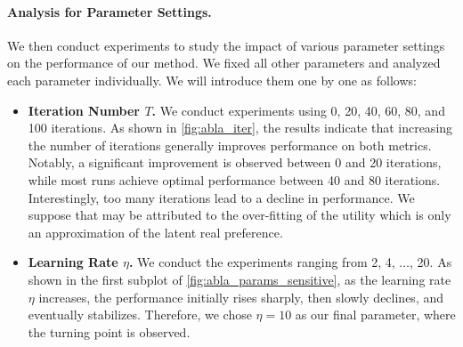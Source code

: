 \paragraph{\textbf{Analysis for Parameter Settings.}} 
We then conduct experiments to study the impact of various parameter settings on the performance of our method. We fixed all other parameters and analyzed each parameter individually. We will introduce them one by one as follows:
\begin{itemize}[leftmargin=*]
\vspace{-1ex}

\item \textbf{Iteration Number $T$.} 
We conduct experiments using 0, 20, 40, 60, 80, and 100 iterations. As shown in \autoref{fig:abla_iter}, the results indicate that increasing the number of iterations generally improves performance on both metrics. 
Notably, a significant improvement is observed between 0 and 20 iterations, while most runs achieve optimal performance between 40 and 80 iterations.
Interestingly, too many iterations lead to a decline in performance. We suppose that may be attributed to the over-fitting of the utility which is only an approximation of the latent real preference.  

\vspace{-1ex}
\item \textbf{Learning Rate $\eta$.} 
We conduct the experiments ranging from 2, 4, $\dots$, 20. As shown in the first subplot of \autoref{fig:abla_params_sensitive}, as the learning rate $\eta$ increases, the performance initially rises sharply, then slowly declines, and eventually stabilizes. Therefore, we chose $\eta = 10$ as our final parameter, where the turning point is observed.


\end{itemize}
